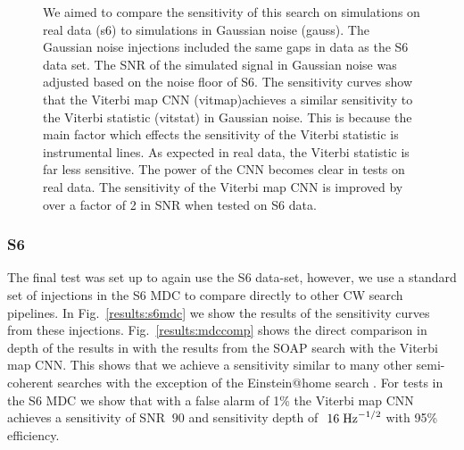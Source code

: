 \begin{figure}
	\caption{\label{results:s6gauss} We aimed to compare the sensitivity of this search on simulations on real data (s6) to simulations in Gaussian noise (gauss). The Gaussian noise injections included the same gaps in data as the S6 data set. The \ac{SNR} of the simulated signal in Gaussian noise was adjusted based on the noise floor of S6. The sensitivity curves show that the Viterbi map \ac{CNN} (vitmap)achieves a similar sensitivity to the Viterbi statistic (vitstat) in Gaussian noise. This is because the main factor which effects the sensitivity of the Viterbi statistic is instrumental lines. As expected in real data, the Viterbi statistic is far less sensitive. The power of the \ac{CNN} becomes clear in tests on real data. The sensitivity of the Viterbi map \ac{CNN} is improved by over a factor of 2 in \ac{SNR} when tested on S6 data.}
	
\end{figure}

\subsubsection{S6}

The final test was set up to again use the S6 data-set, however, we use a standard set of injections in the S6 \ac{MDC} \cite{walsh2016ComparisonMethods} to compare directly to other \ac{CW} search pipelines. In Fig.~\ref{results:s6mdc} we show the results of the sensitivity curves from these injections. Fig.~\ref{results:mdccomp} shows the direct comparison in depth of the results in \cite{walsh2016ComparisonMethods} with the results from the SOAP search with the Viterbi map \ac{CNN}. This shows that we achieve a sensitivity similar to many other semi-coherent searches with the exception of the Einstein@home search \cite{abbott2016ResultsDeepest}. For tests in the S6 \ac{MDC} we show that with a false alarm of 1\% the Viterbi map \ac{CNN} achieves a sensitivity of SNR $~90$ and sensitivity depth of $~16\; {\rm Hz}^{-1/2}$ with 95\% efficiency.


